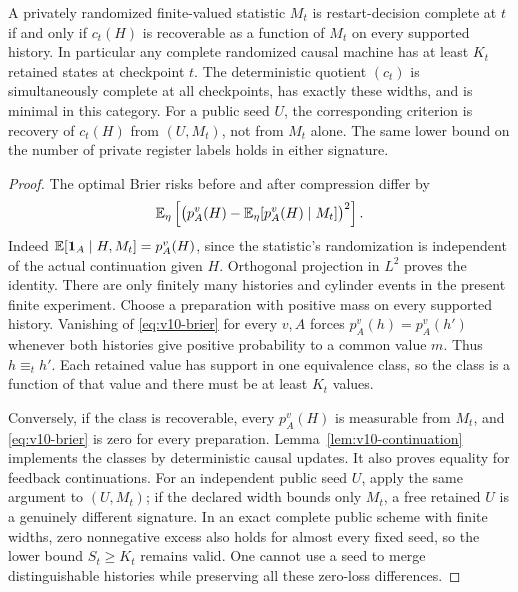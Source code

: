 \begin{theorem}\label{thm:v10-minimal}
A privately randomized finite-valued statistic $M_t$ is restart-decision complete at $t$
if and only if $c_t(H)$ is recoverable as a function of $M_t$ on every
supported history. In particular any complete randomized causal
machine has at least $K_t$ retained states at checkpoint $t$.
The deterministic quotient $(c_t)$ is simultaneously complete at all
checkpoints, has exactly these widths, and is minimal in this category.
For a public seed $U$, the corresponding criterion is recovery of
$c_t(H)$ from $(U,M_t)$, not from $M_t$ alone. The same lower bound
on the number of private register labels holds in either signature.
\end{theorem}
\begin{proof}
The optimal Brier risks before and after compression differ by
\begin{equation}\label{eq:v10-brier}
 \mathbb E_\eta\left[
   \bigl(p_A^v(H)-\mathbb E_\eta[p_A^v(H)\mid M_t]\bigr)^2\right].
\end{equation}
Indeed $\mathbb E[\mathbf 1_A\mid H,M_t]=p_A^v(H)$, since the statistic's
randomization is independent of the actual continuation given $H$.
Orthogonal projection in $L^2$ proves the identity. There are only
finitely many histories and cylinder events in the present finite
experiment. Choose a preparation with positive mass on every
supported history. Vanishing of \eqref{eq:v10-brier} for every $v,A$
forces $p_A^v(h)=p_A^v(h')$ whenever both histories give positive
probability to a common value $m$. Thus $h\equiv_t h'$. Each retained
value has support in one equivalence class, so the class is a function
of that value and there must be at least $K_t$ values.

Conversely, if the class is recoverable, every $p_A^v(H)$ is measurable
from $M_t$, and \eqref{eq:v10-brier} is zero for every preparation.
Lemma~\ref{lem:v10-continuation} implements the classes by deterministic
causal updates. It also proves equality for feedback continuations.
For an independent public seed $U$, apply the same argument to
$(U,M_t)$; if the declared width bounds only $M_t$, a free retained
$U$ is a genuinely different signature. In an exact complete public
scheme with finite widths, zero nonnegative excess also holds for
almost every fixed seed, so the lower bound $S_t\ge K_t$ remains
valid. One cannot use a seed to merge distinguishable histories while
preserving all these zero-loss differences.
\end{proof}

